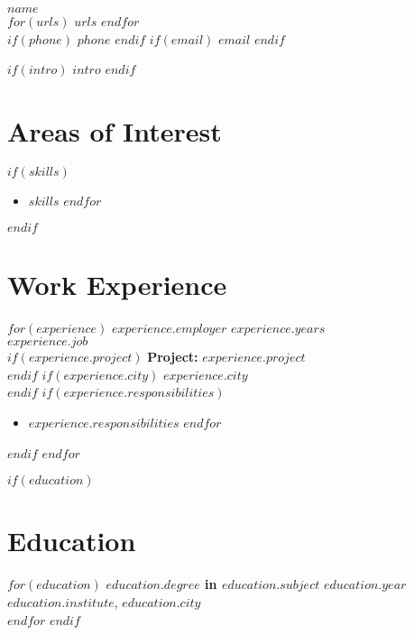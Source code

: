 \documentclass[11pt, a4paper]{article}
\begin{document}
\begin{center}
  {\LARGE \textbf{$name$}}\\[0.2cm]
  $for(urls)$
    \href{http://$urls$}{$urls$}\quad
  $endfor$\\[0.2cm]
  $if(phone)$
    $phone$\quad
  $endif$
  $if(email)$
    \href{mailto:$email$}{$email$}
  $endif$
\end{center}

\vspace{0.5cm}

$if(intro)$
\noindent $intro$
\vspace{0.5cm}
$endif$

\section*{Areas of Interest}
$if(skills)$
\begin{itemize}
  $for(skills)$
    \item $skills$
  $endfor$
\end{itemize}
$endif$

\section*{Work Experience}
$for(experience)$
\noindent\textbf{$experience.employer$} \hfill $experience.years$\\
\emph{$experience.job$}\\
$if(experience.project)$
\textbf{Project:} $experience.project$\\
$endif$
$if(experience.city)$
$experience.city$\\
$endif$
$if(experience.responsibilities)$
\begin{itemize}
  $for(experience.responsibilities)$
    \item $experience.responsibilities$
  $endfor$
\end{itemize}
$endif$
\vspace{0.3cm}
$endfor$

$if(education)$
\section*{Education}
$for(education)$
\noindent\textbf{$education.degree$ in $education.subject$} \hfill $education.year$\\
$education.institute$, $education.city$\\[0.3cm]
$endfor$
$endif$
\end{document}
